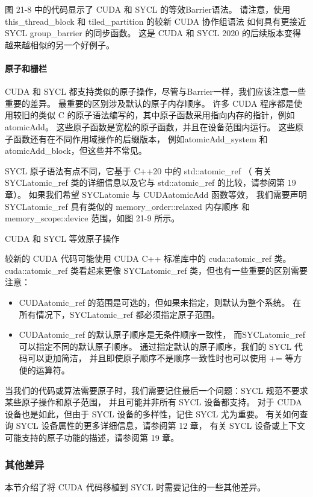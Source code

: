 图 21-8 中的代码显示了 CUDA 和 SYCL 的等效Barrier语法。 
请注意，使用 this\_thread\_block 和 tiled\_partition 的较新 CUDA 协作组语法
如何具有更接近 SYCL group\_barrier 的同步函数。 
这是 CUDA 和 SYCL 2020 的后续版本变得越来越相似的另一个好例子。

\paragraph{原子和栅栏}

CUDA 和 SYCL 都支持类似的原子操作，尽管与Barrier一样，我们应该注意一些重要的差异。 
最重要的区别涉及默认的原子内存顺序。 
许多 CUDA 程序都是使用较旧的类似 C 的原子语法编写的，其中原子函数采用指向内存的指针，例如atomicAdd。 
这些原子函数是宽松的原子函数，并且在设备范围内运行。 
这些原子函数还有在不同作用域操作的后缀版本，
例如atomicAdd\_system 和atomicAdd\_block，但这些并不常见。

SYCL 原子语法有点不同，它基于 C++20 中的 std::atomic\_ref （
有关 SYCLatomic\_ref 类的详细信息以及它与 std::atomic\_ref 的比较，请参阅第 19 章）。 
如果我们希望 SYCLatomic 与 CUDAatomicAdd 函数等效，
我们需要声明 SYCLatomic\_ref 具有类似的 memory\_order::relaxed 内存顺序
和 memory\_scope::device 范围，如图 21-9 所示。

{\color{red} CUDA 和 SYCL 等效原子操作}

较新的 CUDA 代码可能使用 CUDA C++ 标准库中的 cuda::atomic\_ref 类。 
cuda::atomic\_ref 类看起来更像 SYCLatomic\_ref 类，但也有一些重要的区别需要注意：

\begin{itemize}
	\item CUDAatomic\_ref 的范围是可选的，但如果未指定，则默认为整个系统。 
在所有情况下，SYCLatomic\_ref 都必须指定原子范围。

	\item CUDAatomic\_ref 的默认原子顺序是无条件顺序一致性，
而SYCLatomic\_ref 可以指定不同的默认原子顺序。 
通过指定默认的原子顺序，我们的 SYCL 代码可以更加简洁，
并且即使原子顺序不是顺序一致性时也可以使用 += 等方便的运算符。
\end{itemize}

当我们的代码或算法需要原子时，我们需要记住最后一个问题：SYCL 规范不要求某些原子操作和原子范围，
并且可能并非所有 SYCL 设备都支持。 对于 CUDA 设备也是如此，但由于 SYCL 设备的多样性，记住 SYCL 尤为重要。 
有关如何查询 SYCL 设备属性的更多详细信息，请参阅第 12 章，
有关 SYCL 设备或上下文可能支持的原子功能的描述，请参阅第 19 章。

\subsubsection{其他差异}
本节介绍了将 CUDA 代码移植到 SYCL 时需要记住的一些其他差异。

